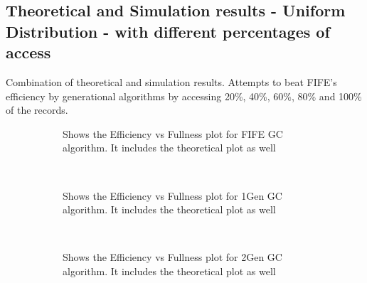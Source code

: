 \subsection{Theoretical and Simulation results - Uniform Distribution - with different percentages of access}
	Combination of theoretical and simulation results. Attempts to beat FIFE's efficiency by generational algorithms by accessing 20\%, 40\%, 60\%, 80\% and 100\% of the records.	

\begin{figure}[H]
        \centering
        \begin{subfigure}[b]{0.4\textwidth}
                \centering
                \caption{Shows the Efficiency vs Fullness plot for FIFE GC algorithm. It includes the theoretical plot as well} \label{FIFE-AllGC-AllAccess-EffVsFull}
        \end{subfigure}
        ~~~ %
        \begin{subfigure}[b]{0.4\textwidth}
                \centering
                \caption{Shows the Efficiency vs Fullness plot for 1Gen GC algorithm. It includes the theoretical plot as well} \label{1Gen-AllGC-AllAccess-EffVsFull}
        \end{subfigure}
        ~~~ %
        \centering
        \begin{subfigure}[b]{0.4\textwidth}
                \centering
                \caption{Shows the Efficiency vs Fullness plot for 2Gen GC algorithm. It includes the theoretical plot as well} \label{2Gen-AllGC-AllAccess-EffVsFull}
        \end{subfigure}
        ~~~ %
        \begin{subfigure}[b]{0.4\textwidth}
                \centering

\end{subfigure}
\end{figure}
